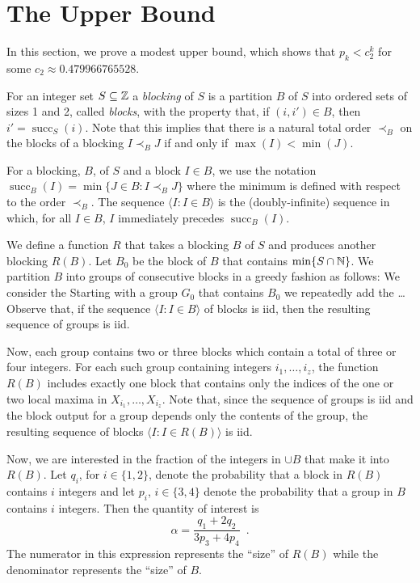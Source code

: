 \documentclass{patmorin}
\DeclareMathOperator{\cw}{succ}
\begin{document}
\section{The Upper Bound}

In this section, we prove a modest upper bound, which shows that $p_k <
c_2^k$ for some $c_2\approx 0.479966765528$. 

For an integer set $S\subseteq\mathbb{Z}$ a \emph{blocking} of $S$ is a partition
$B$ of $S$ into ordered sets of sizes 1 and 2, called \emph{blocks},
with the property that, if $(i,i')\in B$, then $i'=\cw_S(i)$.  Note that
this implies that there is a natural total order $\prec_B$ on the
blocks of a blocking $I\prec_B J$ if and only if $\max(I)<\min(J)$.

For a blocking, $B$, of $S$ and a block $I\in B$, we use the notation
$\cw_B(I)=\min\{J\in B: I \prec_B J\}$ where the minimum is defined with
respect to the order $\prec_B$.  The sequence $\langle I: I\in B\rangle$ is the (doubly-infinite) sequence in which, for all $I\in B$, $I$ immediately precedes $\cw_B(I)$.

We define a function $R$ that takes a blocking $B$ of $S$ and produces
another blocking $R(B)$.  Let $B_0$ be the block of $B$ that contains
$\min\{S\cap \mathbb{N}\}$. We partition $B$ into groups of consecutive blocks
in a greedy fashion as follows:  We consider the Starting with a group
$G_0$ that contains $B_0$ we repeatedly add the \ldots Observe that, if the
sequence $\langle I:I\in B\rangle$ of blocks is iid, then the resulting
sequence of groups is iid.

Now, each group contains two or three blocks which contain a total
of three or four integers.  For each such group containing integers
$i_1,\ldots,i_z$, the function $R(B)$ includes exactly one block
that contains only the indices of the one or two local maxima in
$X_{i_1},\ldots,X_{i_z}$.  Note that, since the sequence of groups is iid
and the block output for a group depends only the contents of the group,
the resulting sequence of blocks $\langle I: I\in R(B)\rangle$ is iid.

Now, we are interested in the fraction of the integers in $\cup B$
that make it into $R(B)$.  Let $q_i$, for $i\in\{1,2\}$, denote the
probability that a block in $R(B)$ contains $i$ integers and let $p_{i}$,
$i\in\{3,4\}$ denote the probability that a group in $B$ contains $i$
integers. Then the quantity of interest is
\[
    \alpha = \frac{q_1+2q_2}{3p_3 + 4p_4} \enspace .
\]
The numerator in this expression represents the ``size'' of $R(B)$ while the denominator represents the ``size'' of $B$.
\end{document}
